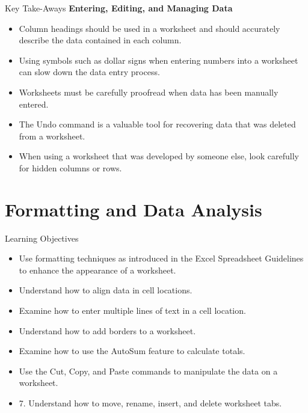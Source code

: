 \begin{center}
	\begin{tkwbox}{Key Take-Aways}
		\textbf{Entering, Editing, and Managing Data}
		\\
		\begin{itemize}
			\setlength{\itemsep}{0pt}
			\setlength{\parskip}{0pt}
			\setlength{\parsep}{0pt}
			
			\item Column headings should be used in a worksheet and should accurately describe the data contained in each column.
			\item Using symbols such as dollar signs when entering numbers into a worksheet can slow down the data entry process.
			\item Worksheets must be carefully proofread when data has been manually entered.
			\item The Undo command is a valuable tool for recovering data that was deleted from a worksheet.
			\item When using a worksheet that was developed by someone else, look carefully for hidden columns or rows.
			
		\end{itemize}
	\end{tkwbox}
\end{center}

\section{Formatting and Data Analysis}

\begin{center}
	\begin{objbox}{Learning Objectives}
		\begin{itemize}
			\setlength{\itemsep}{0pt}
			\setlength{\parskip}{0pt}
			\setlength{\parsep}{0pt}
			
			\item Use formatting techniques as introduced in the Excel Spreadsheet Guidelines to enhance the appearance of a worksheet.
			\item Understand how to align data in cell locations.
			\item Examine how to enter multiple lines of text in a cell location.
			\item Understand how to add borders to a worksheet.
			\item Examine how to use the AutoSum feature to calculate totals.
			\item Use the Cut, Copy, and Paste commands to manipulate the data on a worksheet.
			\item 7. Understand how to move, rename, insert, and delete worksheet tabs.
		\end{itemize}
	\end{objbox}
\end{center}

